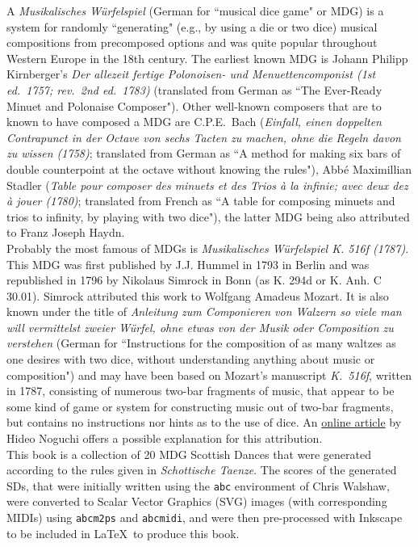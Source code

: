 \documentclass[a4paper,x11names,svgnames,10pt]{article}
\begin{document}
{A {\it Musikalisches W\"{u}rfelspiel} (German for ``musical dice game" or MDG) is a system for randomly ``generating" (e.g., by using a die or two dice) musical compositions from precomposed options and was quite popular throughout Western Europe in the 18th century.  The earliest known MDG is Johann Philipp Kirnberger's {\em Der allezeit fertige Polonoisen- und Menuettencomponist (1st ed.\ 1757; rev.\ 2nd ed.\ 1783)} (translated from German as ``The Ever-Ready Minuet and Polonaise Composer").  Other well-known composers that are to known to have composed a MDG are C.P.E.\ Bach ({\em Einfall, einen doppelten Contrapunct in der Octave von sechs Tacten zu machen, ohne die Regeln davon zu wissen (1758)}; translated from German as ``A method for making six bars of double counterpoint at the octave without knowing the rules"), Abb\'{e} Maximillian Stadler ({\em Table pour composer des minuets et des Trios \`{a} la infinie; avec deux dez \`{a} jouer (1780)}; translated from French as ``A table for composing minuets and trios to infinity, by playing with two dice"), the latter MDG being also attributed to Franz Joseph Haydn. \\

Probably the most famous of MDGs is {\it Musikalisches W\"{u}rfelspiel K. 516f (1787)}.  This MDG was first published by J.J. Hummel in 1793 in Berlin and was republished in 1796 by Nikolaus Simrock in Bonn (as K. 294d or K. Anh. C 30.01). Simrock attributed this work to Wolfgang Amadeus Mozart. It is also known under the title of {\em Anleitung zum Componieren von Walzern so viele man will vermittelst zweier W\"{u}rfel, ohne etwas von der Musik oder Composition zu verstehen} (German for ``Instructions for the composition of as many waltzes as one desires with two dice, without understanding anything about music or composition") and may have been based on Mozart's manuscript {\em K.\ 516f}, written in 1787, consisting of numerous two-bar fragments of music, that appear to be some kind of game or system for constructing music out of two-bar fragments, but contains no instructions nor hints as to the use of dice.  An \href{(http://www.asahi-net.or.jp/\~rb5h-ngc/e/k516f.htm}{online article} by Hideo Noguchi offers a possible explanation for this attribution. \\

This book is a collection of 20 MDG Scottish Dances that were generated according to the rules given in {\it Schottische Taenze}. The scores of the generated SDs, that were initially written using the \texttt{abc} environment of Chris Walshaw, were converted to Scalar Vector Graphics (SVG) images (with corresponding MIDIs) using {\tt abcm2ps} and {\tt abcmidi}, and were then pre-processed with Inkscape to be included in \LaTeX\ to produce this book.


}
\end{document}
